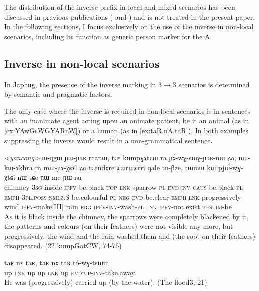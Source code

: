 \documentclass[oldfontcommands,oneside,a4paper,11pt]{article}
\newcommand{\ipa}[1]{{\phon \mbox{#1}}} %
\begin{document}
The distribution of the inverse prefix in local and mixed scenarios has been discussed in previous publications (\citealt{jacques10inverse} and \citealt{jacques14inverse}) and is not treated in the present paper. In the following sections, I focus exclusively on the use of the inverse in non-local scenarios, including its function as generic person marker for the A.

\subsection{Inverse in non-local scenarios} \label{sec:obv.jpg}
In Japhug, the presence of the inverse marking in  3$\rightarrow$3 scenarios is determined by semantic and pragmatic factors. 

The only case where the inverse is required in non-local scenarios is in sentences with an inanimate agent acting upon an animate patient, be it an animal (as in \ref{ex:YAwGsWGYARnW}) or a human (as in \ref{ex:taR.nA.taR}). In both examples suppressing the inverse would result in a non-grammatical sentence.  
 

 \begin{exe}
\ex \label{ex:YAwGsWGYARnW} 
\gll
\textit{<yancong>}	\ipa{ɯ-ŋgɯ} 	\ipa{ɲɯ-ɲaʁ} 	\ipa{rcanɯ,} 	\ipa{tɕe} 	\ipa{kumpɣɤtɕɯ} 	\ipa{ra} 	\ipa{ɲɤ́-wɣ-sɯɣ-ɲaʁ-nɯ} 	\ipa{ʑo,} 	\ipa{nɯ-kɯ-ɤkhra} 	\ipa{ra} 	\ipa{mɯ-ɲɤ-χsɤl} 	\ipa{ʑo} 	\ipa{tɕendɤre} 	\ipa{ʑɯrɯʑɤri} 	\ipa{qale} 	\ipa{tu-βze,} 	\ipa{tɯmɯ} 	\ipa{kɯ} 	\ipa{pjɯ́-wɣ-χtɕi-nɯ} 	\ipa{tɕe} 	\ipa{ɲɯ-me} 	\ipa{ɲɯ-ŋu} \\
chimney \textsc{3sg}-inside \textsc{ipfv}-be.black \textsc{top} \textsc{lnk} sparrow \textsc{pl} \textsc{evd-inv-caus}-be.black-\textsc{pl} \textsc{emph} \textsc{3pl.poss-nmlz}:S-be.colourful \textsc{pl} \textsc{neg-evd}-be.clear \textsc{emph} \textsc{lnk} progressively wind \textsc{ipfv}-make[III] rain \textsc{erg} \textsc{ipfv-inv}-wash-\textsc{pl} \textsc{lnk} \textsc{ipfv}-not.exist \textsc{testim}-be \\
\glt As it is black inside the chimney, the sparrows were completely blackened by it, the patterns and colours (on their feathers) were not visible any more, but progressively, the wind and the rain washed them and (the soot on their feathers) disappeared.
 (22 kumpGatCW, 74-76)
\end{exe}

 \begin{exe}
\ex \label{ex:taR.nA.taR} 
\gll
\ipa{taʁ}   	\ipa{nɤ}   	\ipa{taʁ,}   	\ipa{taʁ}   	\ipa{nɤ}   	\ipa{taʁ}   	\ipa{tó-wɣ-tsɯm}   \\
up \textsc{lnk} up up \textsc{lnk} up \textsc{evd:up-inv-}take.away \\
\glt He was (progressively)  carried up (by the water). (The flood3, 21)
\end{exe}
\end{document}
